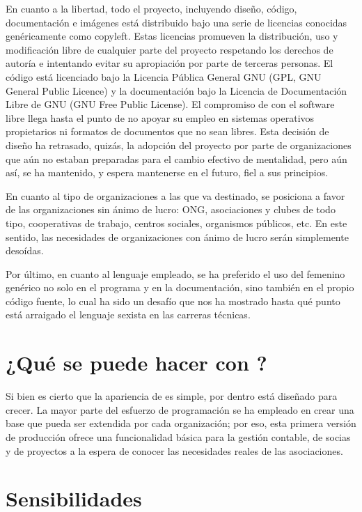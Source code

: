 En cuanto a la libertad, todo el proyecto, incluyendo diseño,
código, documentación e imágenes está distribuido bajo una
serie de licencias conocidas genéricamente como copyleft. Estas
licencias promueven la distribución, uso y modificación libre de
cualquier parte del proyecto respetando los derechos de autoría e
intentando evitar su apropiación por parte de terceras personas. El
código está licenciado bajo la Licencia Pública General GNU (GPL,
GNU General Public Licence) y la documentación bajo la Licencia de
Documentación Libre de GNU (GNU Free Public License). El compromiso
de \appname con el software libre llega hasta el punto de no apoyar su
empleo en sistemas operativos propietarios ni formatos de documentos
que no sean libres. Esta decisión de diseño ha retrasado, quizás,
la adopción del proyecto por parte de organizaciones que aún no
estaban preparadas para el cambio efectivo de mentalidad, pero aún
así, \appname se ha mantenido, y espera mantenerse en el futuro, fiel
a sus principios.

En cuanto al tipo de organizaciones a las que va destinado, \appname se
posiciona a favor de las organizaciones sin ánimo de lucro: ONG,
asociaciones y clubes de todo tipo, cooperativas de trabajo, centros
sociales, organismos públicos, etc. En este sentido, las necesidades
de organizaciones con ánimo de lucro serán simplemente desoídas.

Por último, en cuanto al lenguaje empleado, se ha preferido el uso del
femenino genérico no solo en el programa y en la documentación,
sino también en el propio código fuente, lo cual ha sido un
desafío que nos ha mostrado hasta qué punto está arraigado el
lenguaje sexista en las carreras técnicas.

\section{¿Qué se puede hacer con \appname?}
Si bien es cierto que la apariencia de \appname es simple, por dentro
está diseñado para crecer. La mayor parte del esfuerzo de
programación se ha empleado en crear una base que pueda ser extendida
por cada organización; por eso, esta primera versión de
producción ofrece una funcionalidad básica para la gestión
contable, de socias y de proyectos a la espera de conocer las
necesidades reales de las asociaciones. 

\section{Sensibilidades}

